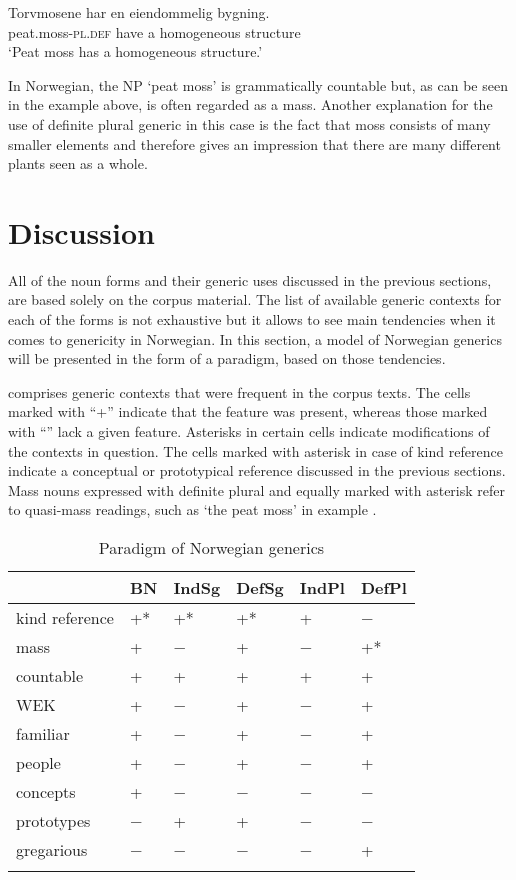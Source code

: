 \documentclass[output=paper]{langsci/langscibook}
\begin{document}
\ea\label{ex:moss}
	\gll Torvmosene har en eiendommelig bygning. \\
		peat.moss-\textsc{pl}.\textsc{def} have a homogeneous structure \\
	\glt `Peat moss has a homogeneous structure.'
\z

In Norwegian, the NP `peat moss' is grammatically countable but, as can be seen in the example above, is often regarded as a mass. Another explanation for the use of definite plural generic in this case is the fact that moss consists of many smaller elements and therefore gives an impression that there are many different plants seen as a whole.

\section{Discussion}
\label{sec:discussion}
All of the noun forms and their generic uses discussed in the previous sections, are based solely on the corpus material. The list of available generic contexts for each of the forms is not exhaustive but it allows to see main tendencies when it comes to genericity in Norwegian. In this section, a model of Norwegian generics will be presented in the form of a paradigm, based on those tendencies.

 comprises generic contexts that were frequent in the corpus texts. The cells marked with “+” indicate that the feature was present, whereas those marked with “{\textminus}” lack a given feature. Asterisks in certain cells indicate modifications of the contexts in question. The cells marked with asterisk in case of kind reference indicate a conceptual or prototypical reference discussed in the previous sections. Mass nouns expressed with definite plural and equally marked with asterisk refer to quasi-mass readings, such as `the peat moss' in example .

\begin{table}
\caption{Paradigm of Norwegian generics}
\label{tab:paradigm}
\begin{tabular}{llllll} 
\lsptoprule
                    & BN & IndSg & DefSg & IndPl & DefPl \\ 
   \midrule
   kind reference   &  +* &   +*   &  +*  & +    & − \\
   mass             &  + &   −   &    +  & −     & +* \\
   countable        &  + &   +   &    +  & +     & + \\
   WEK              &  + &   −   &    +  & −     & + \\
   familiar         &  + &   −   &    +  & −     & + \\
   people           &  + &   −   &    +  & −     & + \\
   concepts         &  + &   −   &    −  & −     & − \\
   prototypes       &  − &   +   &    +  & −     & − \\
   gregarious       &  − &   −   &    −  & −     & + \\
   \lspbottomrule
  \end{tabular}
 \end{table}
\end{document}
